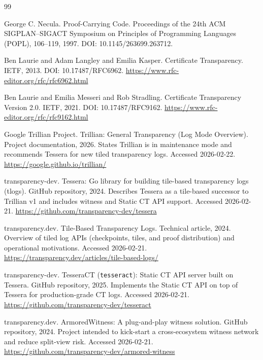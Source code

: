 \documentclass[11pt]{article}
\begin{document}
\begin{thebibliography}{99}\small

George C. Necula.
\newblock Proof-Carrying Code.
\newblock Proceedings of the 24th ACM SIGPLAN--SIGACT Symposium on Principles of Programming Languages (POPL), 106--119, 1997.
\newblock DOI: 10.1145/263699.263712.

Ben Laurie and Adam Langley and Emilia Kasper.
\newblock Certificate Transparency.
\newblock IETF, 2013.
\newblock DOI: 10.17487/RFC6962.
\newblock \url{https://www.rfc-editor.org/rfc/rfc6962.html}

Ben Laurie and Emilia Messeri and Rob Stradling.
\newblock Certificate Transparency Version 2.0.
\newblock IETF, 2021.
\newblock DOI: 10.17487/RFC9162.
\newblock \url{https://www.rfc-editor.org/rfc/rfc9162.html}

{Google Trillian Project}.
\newblock Trillian: General Transparency (Log Mode Overview).
\newblock Project documentation, 2026.
\newblock States Trillian is in maintenance mode and recommends Tessera for new tiled transparency logs. Accessed 2026-02-22.
\newblock \url{https://google.github.io/trillian/}

{transparency-dev}.
\newblock Tessera: Go library for building tile-based transparency logs (tlogs).
\newblock GitHub repository, 2024.
\newblock Describes Tessera as a tile-based successor to Trillian v1 and includes witness and Static CT API support. Accessed 2026-02-21.
\newblock \url{https://github.com/transparency-dev/tessera}

{transparency.dev}.
\newblock Tile-Based Transparency Logs.
\newblock Technical article, 2024.
\newblock Overview of tiled log APIs (checkpoints, tiles, and proof distribution) and operational motivations. Accessed 2026-02-21.
\newblock \url{https://transparency.dev/articles/tile-based-logs/}

{transparency-dev}.
\newblock TesseraCT (\texttt{tesseract}): Static CT API server built on Tessera.
\newblock GitHub repository, 2025.
\newblock Implements the Static CT API on top of Tessera for production-grade CT logs. Accessed 2026-02-21.
\newblock \url{https://github.com/transparency-dev/tesseract}

{transparency.dev}.
\newblock ArmoredWitness: A plug-and-play witness solution.
\newblock GitHub repository, 2024.
\newblock Project intended to kick-start a cross-ecosystem witness network and reduce split-view risk. Accessed 2026-02-21.
\newblock \url{https://github.com/transparency-dev/armored-witness}


\end{thebibliography}
\end{document}
